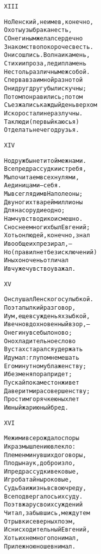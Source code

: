 \begin{minipage}[t]{\dimexpr 0.5\textwidth -\tabcolsep-.5pt}
\begin{alltt}\normalfont\centering
XIII

Но Ленский, не имев, конечно,
Охоты узы брака несть,
С Онегиным желал сердечно
Знакомство покороче свесть.
Они сошлись. Волна и камень,
Стихи и проза, лед и пламень
Не столь различны меж собой.
Сперва взаимной разнотой
Они друг другу были скучны;
Потом понравились; потом
Съезжались каждый день верхом
И скоро стали неразлучны.
Так люди (первый каюсь я)
От делать нечего друзья.
\end{alltt}
\end{minipage}

\begin{minipage}[t]{\dimexpr 0.5\textwidth -\tabcolsep-.5pt}
\begin{alltt}\normalfont\centering
XIV

Но дружбы нет и той меж нами.
Все предрассудки истребя,
Мы почитаем всех нулями,
А единицами — себя.
Мы все глядим в Наполеоны;
Двуногих тварей миллионы
Для нас орудие одно;
Нам чувство дико и смешно.
Сноснее многих был Евгений;
Хоть он людей, конечно, знал
И вообще их презирал, —
Но (правил нет без исключений)
Иных он очень отличал
И вчуже чувство уважал.
\end{alltt}
\end{minipage}
\clearpage

\begin{minipage}[t]{\dimexpr 0.5\textwidth -\tabcolsep-.5pt}
\begin{alltt}\normalfont\centering
XV

Он слушал Ленского с улыбкой.
Поэта пылкий разговор,
И ум, еще в сужденьях зыбкой,
И вечно вдохновенный взор, —
Онегину все было ново;
Он охладительное слово
В устах старался удержать
И думал: глупо мне мешать
Его минутному блаженству;
И без меня пора придет;
Пускай покамест он живет
Да верит мира совершенству;
Простим горячке юных лет
И юный жар и юный бред.
\end{alltt}
\end{minipage}

\begin{minipage}[t]{\dimexpr 0.5\textwidth -\tabcolsep-.5pt}
\begin{alltt}\normalfont\centering
XVI

Меж ими все рождало споры
И к размышлению влекло:
Племен минувших договоры,
Плоды наук, добро и зло,
И предрассудки вековые,
И гроба тайны роковые,
Судьба и жизнь в свою чреду,
Все подвергалось их суду.
Поэт в жару своих суждений
Читал, забывшись, между тем
Отрывки северных поэм,
И снисходительный Евгений,
Хоть их не много понимал,
Прилежно юноше внимал.
\end{alltt}
\end{minipage}
\clearpage

